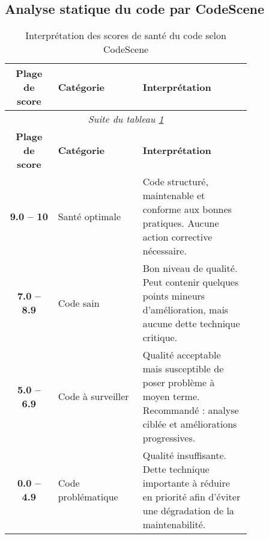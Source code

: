 \subsection{Analyse statique du code par CodeScene} \label{sec:codescene}

\begin{longtable}{|c|p{0.35\linewidth}|p{0.45\linewidth}|}
\caption{\label{tab:codescene_thresholds} Interprétation des scores de santé du code selon CodeScene} \\
\hline
\textbf{Plage de score} & \textbf{Catégorie} & \textbf{Interprétation} \\
\hline
\endfirsthead

\multicolumn{3}{c}{\textit{Suite du tableau \ref{tab:codescene_thresholds}}} \\
\hline
\textbf{Plage de score} & \textbf{Catégorie} & \textbf{Interprétation} \\
\hline
\endhead

\hline
\textbf{9.0 -- 10} & Santé optimale & Code structuré, maintenable et conforme aux bonnes pratiques. Aucune action corrective nécessaire. \\
\hline
\textbf{7.0 -- 8.9} & Code sain & Bon niveau de qualité. Peut contenir quelques points mineurs d’amélioration, mais aucune dette technique critique. \\
\hline
\textbf{5.0 -- 6.9} & Code à surveiller & Qualité acceptable mais susceptible de poser problème à moyen terme. Recommandé : analyse ciblée et améliorations progressives. \\
\hline
\textbf{0.0 -- 4.9} & Code problématique & Qualité insuffisante. Dette technique importante à réduire en priorité afin d’éviter une dégradation de la maintenabilité. \\
\hline
\end{longtable}
